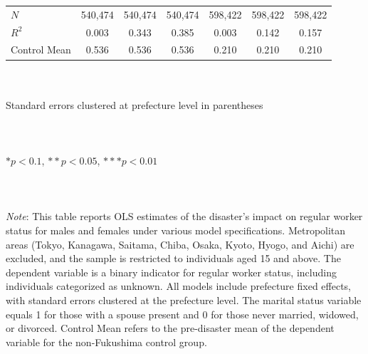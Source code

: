 \documentclass[serif, aspectratio=169]{beamer}
\begin{document}
\begin{frame}
\begin{table}[htbp]
\begin{tabular}{@{}l*{6}{c}@{}}
$\textit{N}$&  540,474         &  540,474         &  540,474         &  598,422         &  598,422         &  598,422         \\
$\textit{R}^2$&    0.003         &    0.343         &    0.385         &    0.003         &    0.142         &    0.157         \\
Control Mean&    0.536         &    0.536         &    0.536         &    0.210         &    0.210         &    0.210         \\
\bottomrule
\end{tabular}
\\\\{\linewidth}{\tiny Standard errors clustered at prefecture level in parentheses}\\\\
\\\\{\linewidth}{\tiny $*p<0.1$, $**p<0.05$, $***p<0.01$}\\\\
\\\\{\linewidth}{\tiny \textit{Note}: This table reports OLS estimates of the disaster's impact on regular worker status for males and females under various model specifications. Metropolitan areas (Tokyo, Kanagawa, Saitama, Chiba, Osaka, Kyoto, Hyogo, and Aichi) are excluded, and the sample is restricted to individuals aged 15 and above. The dependent variable is a binary indicator for regular worker status, including individuals categorized as unknown. All models include prefecture fixed effects, with standard errors clustered at the prefecture level. The marital status variable equals 1 for those with a spouse present and 0 for those never married, widowed, or divorced. Control Mean refers to the pre-disaster mean of the dependent variable for the non-Fukushima control group.}
\end{table}


\end{frame}

\end{document}
